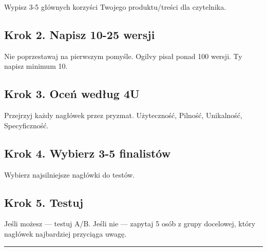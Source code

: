 \documentclass[
  12pt,
  a4paper,
  twoside,
  openright,
  12pt,
  DIV=12,
  BCOR=12mm]{scrbook}
\newcommand{\decoline}{%
  \begin{center}
    \textcolor{bordergray}{\rule{0.3\textwidth}{0.5pt}}
  \end{center}
}
\begin{document}
Wypisz 3-5 głównych korzyści Twojego produktu/treści dla czytelnika.

\subsection{Krok 2. Napisz 10-25
wersji}\label{krok-2.-napisz-10-25-wersji}

Nie poprzestawaj na pierwszym pomyśle. Ogilvy pisał ponad 100 wersji. Ty
napisz minimum 10.

\subsection{Krok 3. Oceń według
4U}\label{krok-3.-oceux144-wedux142ug-4u}

Przejrzyj każdy nagłówek przez pryzmat. Użyteczność, Pilność,
Unikalność, Specyficzność.

\subsection{Krok 4. Wybierz 3-5
finalistów}\label{krok-4.-wybierz-3-5-finalistuxf3w}

Wybierz najsilniejsze nagłówki do testów.

\subsection{Krok 5. Testuj}\label{krok-5.-testuj}

Jeśli możesz --- testuj A/B. Jeśli nie --- zapytaj 5 osób z grupy
docelowej, który nagłówek najbardziej przyciąga uwagę.

\decoline
\end{document}
